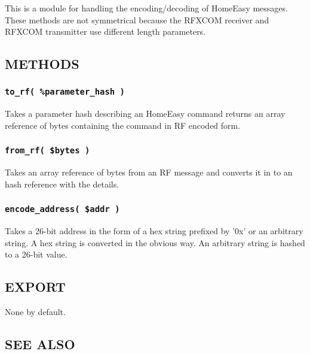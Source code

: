 \documentclass[12pt,a4paper]{article}
\begin{document}
This is a module for handling the encoding/decoding of HomeEasy
messages.  These methods are not symmetrical because the RFXCOM
receiver and RFXCOM transmitter use different length parameters.

\subsection*{METHODS\label{xPL::HomeEasy_METHODS}}
\subsubsection*{\texttt{to\_rf( \%parameter\_hash )}\label{xPL::HomeEasy_to_rf_parameter_hash_}}


Takes a parameter hash describing an HomeEasy command returns an array
reference of bytes containing the command in RF encoded form.

\subsubsection*{\texttt{from\_rf( \$bytes )}\label{xPL::HomeEasy_from_rf_bytes_}}


Takes an array reference of bytes from an RF message and converts it
in to an hash reference with the details.

\subsubsection*{\texttt{encode\_address( \$addr )}\label{xPL::HomeEasy_encode_address_addr_}}


Takes a 26-bit address in the form of a hex string prefixed by '0x' or
an arbitrary string.  A hex string is converted in the obvious way.
An arbitrary string is hashed to a 26-bit value.

\subsection*{EXPORT\label{xPL::HomeEasy_EXPORT}}


None by default.

\subsection*{SEE ALSO\label{xPL::HomeEasy_SEE_ALSO}}
\end{document}
